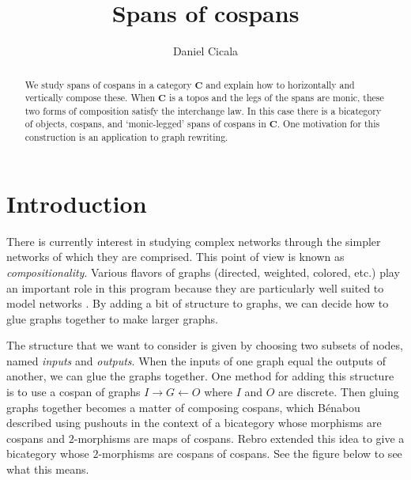 \documentclass{tac}
\author{Daniel Cicala}
\title {Spans of cospans}
\begin{document}

\maketitle

\begin{abstract}
	We study spans of cospans in a category $ \mathbf{C} $ 
	and explain how to horizontally and vertically compose these.  
	When $ \mathbf{C} $ is a topos and the legs of the spans are monic, 
	these two forms of composition satisfy the interchange law.  
	In this case there is a bicategory of objects, cospans, and 
	`monic-legged' spans of cospans in $ \mathbf{C} $.  
	One motivation for this construction is an application to graph rewriting.
\end{abstract}


\section{Introduction} 

There is currently interest in studying complex networks
through the simpler networks of which they are comprised. 
This point of view is known as \textit{compositionality}. 
Various flavors of graphs (directed, weighted, colored, etc.)
play an important role in this program because 
they are particularly well suited to model networks
\cite{Baez_CompFrameMarkovProcess,
	Baez_CompFrameLinearNetworks,
	RoseSabadinWalters_SepAlgNCospansGraphs,
	RoseSabadinWalters_CalcColimsComp}. 
By adding a bit of structure to graphs, we can decide 
how to glue graphs together to make larger graphs.  

The structure that we want to consider 
is given by choosing two subsets of nodes, 
named \textit{inputs} and \textit{outputs}. 
When the inputs of one graph equal 
the outputs of another, 
we can glue the graphs together. 
One method for adding this structure 
is to use a cospan of graphs 
	$I \to G \leftarrow O$ 
where $I$ and $O$ are discrete. 
Then gluing graphs together becomes 
a matter of composing cospans, 
which B\'{e}nabou 
	\cite{Benabou_Bicats} 
described using pushouts in the context 
of a bicategory whose morphisms are cospans 
and $2$-morphisms are maps of cospans. 
Rebro 
	\cite{Rebro_Span2} 
extended this idea to give a bicategory 
whose $2$-morphisms are cospans of cospans. 
See the figure below to see what this means.    
\end{document}

